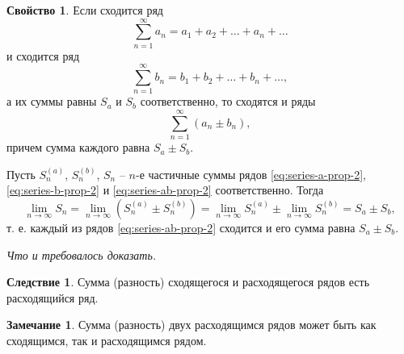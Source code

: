 \documentclass[a5paper, 11pt]{extbook}
\theoremstyle{definition}
\newtheorem{property}{Свойство}[section]
\theoremstyle{definition}
\theoremstyle{definition}
\newtheorem*{consequence*}{Следствие}
\newtheorem*{note*}{Замечание}
\newcommand{\newpar}{$ $\par\nobreak\ignorespaces}
\renewenvironment{proof}{{\noindent\bfseries Доказательство.}}{\smallskip\newpar \hfill\textit{Что и требовалось доказать.}}
\begin{document}
\begin{property}
    Если сходится ряд
    \begin{equation}
        \label{eq:series-a-prop-2}
        \sum_{n = 1}^{\infty} a_n = a_1 + a_2 + \ldots + a_n + \ldots
    \end{equation}
    и сходится ряд
    \begin{equation}
        \label{eq:series-b-prop-2}
        \sum_{n = 1}^{\infty} b_n = b_1 + b_2 + \ldots + b_n + \ldots,
    \end{equation}
    а их суммы равны \(S_a\) и \(S_b\) соответственно, то сходятся и ряды
    \begin{equation}
        \label{eq:series-ab-prop-2}
        \sum_{n = 1}^{\infty} (a_n \pm b_n),
    \end{equation}
    причем сумма каждого равна \(S_a \pm S_b\).

    \begin{proof}
        Пусть \(S_n^{(a)}\), \(S_n^{(b)}\), \(S_n\) -- \(n\)-е частичные суммы рядов \eqref{eq:series-a-prop-2}, \eqref{eq:series-b-prop-2} и \eqref{eq:series-ab-prop-2} соответственно. Тогда
        \[
            \lim_{n \to \infty} S_n =
            \lim_{n \to \infty} (S_n^{(a)} \pm S_n^{(b)}) =
            \lim_{n \to \infty} S_n^{(a)} \pm \lim_{n \to \infty} S_n^{(b)} =
            S_a \pm S_b,
        \]
        т. е. каждый из рядов \eqref{eq:series-ab-prop-2} сходится и его сумма равна \(S_a \pm S_b\).
    \end{proof}

    \begin{consequence*}
        Сумма (разность) сходящегося и расходящегося рядов есть расходящийся ряд.
    \end{consequence*}

    \begin{note*}
        Сумма (разность) двух расходящимся рядов может быть как сходящимся, так и расходящимся рядом.
    \end{note*}
\end{property}
\end{document}
